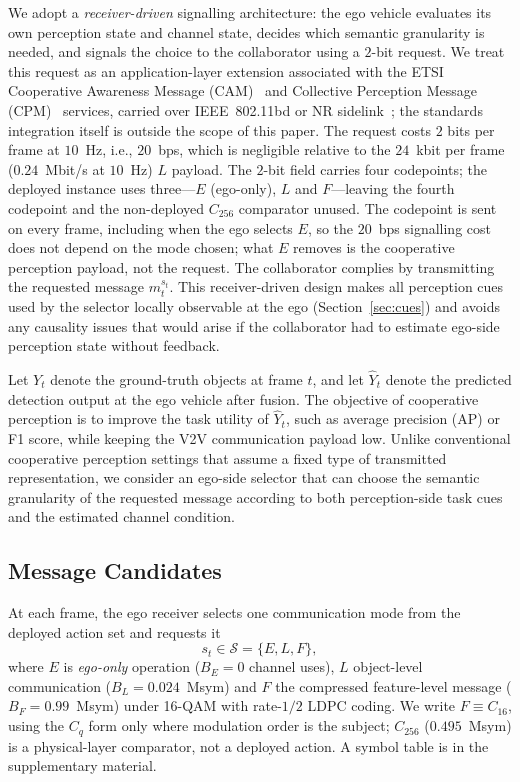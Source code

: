 \documentclass[journal]{IEEEtran}
\begin{document}
We adopt a \emph{receiver-driven} signalling architecture: the ego vehicle evaluates its own perception state and channel state, decides which semantic granularity is needed, and signals the choice to the collaborator using a $2$-bit request. We treat this request as an application-layer extension associated with the ETSI Cooperative Awareness Message (CAM)~\cite{etsi_cam} and Collective Perception Message (CPM)~\cite{etsi_cpm} services, carried over IEEE~802.11bd or NR sidelink~\cite{ieee80211bd}; the standards integration itself is outside the scope of this paper. The request costs $2$ bits per frame at $10$~Hz, i.e., $20$~bps, which is negligible relative to the $24$~kbit per frame ($0.24$~Mbit/s at $10$~Hz) $L$ payload. The $2$-bit field carries four codepoints; the deployed instance uses three---$E$ (ego-only), $L$ and $F$---leaving the fourth codepoint and the non-deployed $C_{256}$ comparator unused. The codepoint is sent on every frame, including when the ego selects $E$, so the $20$~bps signalling cost does not depend on the mode chosen; what $E$ removes is the cooperative perception payload, not the request. The collaborator complies by transmitting the requested message $m_t^{s_t}$. This receiver-driven design makes all perception cues used by the selector locally observable at the ego (Section~\ref{sec:cues}) and avoids any causality issues that would arise if the collaborator had to estimate ego-side perception state without feedback.

Let $Y_t$ denote the ground-truth objects at frame $t$, and let $\hat{Y}_t$ denote the predicted detection output at the ego vehicle after fusion. The objective of cooperative perception is to improve the task utility of $\hat{Y}_t$, such as average precision (AP) or F1 score, while keeping the V2V communication payload low. Unlike conventional cooperative perception settings that assume a fixed type of transmitted representation, we consider an ego-side selector that can choose the semantic granularity of the requested message according to both perception-side task cues and the estimated channel condition.

\subsection{Message Candidates}\label{sec:candidates}

At each frame, the ego receiver selects one communication mode from the deployed action set and requests it
\begin{equation}
s_t \in \mathcal{S} = \{E, L, F\},
\label{eq:action_set}
\end{equation}
where $E$ is \emph{ego-only} operation ($B_E = 0$ channel uses), $L$ object-level communication ($B_L = 0.024$~Msym) and $F$ the compressed feature-level message ($B_F = 0.99$~Msym) under 16-QAM with rate-$1/2$ LDPC coding. We write $F \equiv C_{16}$, using the $C_q$ form only where modulation order is the subject; $C_{256}$ ($0.495$~Msym) is a physical-layer comparator, not a deployed action. A symbol table is in the supplementary material.
\end{document}
